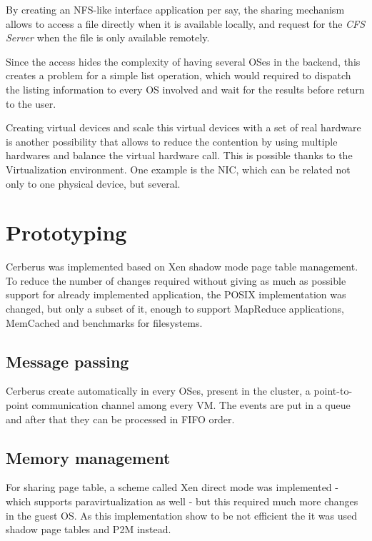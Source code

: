 \documentclass[journal]{IEEEtran}
\begin{document}
\begin{itemize}
	By creating an NFS-like interface application per say, the sharing mechanism allows to access a file directly when it is available locally, and request for the \emph{CFS Server} when the file is only available remotely.

	Since the access hides the complexity of having several OSes in the backend, this creates a problem for a simple list operation, which would required to dispatch the listing information to every OS involved and wait for the results before return to the user.
	
	Creating virtual devices and scale this virtual devices with a set of real hardware is another possibility that allows to reduce the contention by using multiple hardwares and balance the virtual hardware call. This is possible thanks to the Virtualization environment. One example is the NIC, which can be related not only to one physical device, but several. 
	
	\section{Prototyping}
	
	Cerberus was implemented based on Xen shadow mode page table management. To reduce the number of changes required without giving as much as possible support for already implemented application, the POSIX implementation was changed, but only a subset of it, enough to support MapReduce applications, MemCached and benchmarks for filesystems.
	
	\subsection{Message passing}
	
	Cerberus create automatically in every OSes, present in the cluster, a point-to-point communication channel among every VM. The events are put in a queue and after that they can be processed in FIFO order.
	
	
	\subsection{Memory management}
	
	For sharing page table, a scheme called Xen direct mode was implemented - which supports paravirtualization as well - but this required much more changes in the guest OS. As this implementation show to be not efficient the it was used shadow page tables and P2M instead.
	

\end{itemize}
\end{document}
